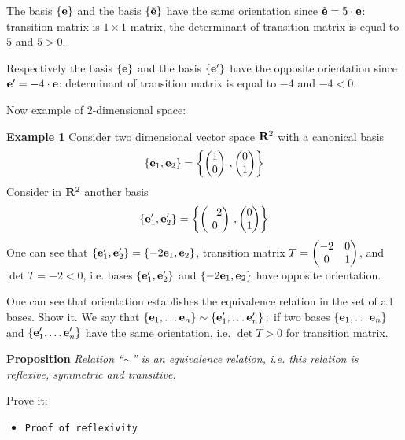 \documentclass[12pt]{article}
\numberwithin{equation}{section}
\begin{document}
The basis  $\{{\bf e}\}$ and  the basis $\{\tilde {{\bf e}}\}$ 
have the same orientation since $\tilde {{\bf e}}=5\cdot {\bf e}$:
transition matrix is $1\times 1$ matrix, the determinant 
of transition matrix is equal to $5$ and $5>0$.

Respectively the basis  $\{{\bf e}\}$ and  the basis $\{{\bf e}'\}$ 
have the opposite orientation since ${\bf e}'=-4\cdot {\bf e}$:
determinant of transition matrix is equal to $-4$ and $-4<0$.

\m

Now example of $2$-dimensional space:

  {\bf Example 1}  Consider two dimensional vector space
${\bf R}^2$ with a canonical basis  
           $$
 \{{\bf e}_1,{\bf e}_2\}=\left\{
     \begin{pmatrix}1\cr 0\cr\end{pmatrix}\,,
     \begin{pmatrix}0\cr 1\cr\end{pmatrix}
        \right\}
       $$
Consider in ${\bf R}^2$ another basis
           $$
 \{{\bf e}'_1,{\bf e}'_2\}=\left\{
     \begin{pmatrix}-2\cr 0\cr\end{pmatrix}\,,
     \begin{pmatrix}0\cr 1\cr\end{pmatrix}
        \right\}
       $$
One can see that $\{{\bf e}'_1,{\bf e}'_2\}=\{-2{\bf e}_1,{\bf e}_2\}$,
transition matrix 
$T=\begin{pmatrix} -2 & 0\cr 0 & 1\cr\end{pmatrix}$,
and $\det T=-2<0$, i.e. bases $\{{\bf e}'_1,{\bf e}'_2\}$ and
 $\{-2{\bf e}_1,{\bf e}_2\}$ have opposite orientation.
  


  One can see that orientation establishes  
the equivalence relation in the set of all bases. 
Show it.
  We say that 
                $
                \{{\bf e}_1,\dots{\bf e}_n\}\sim \{{\bf e}'_1,\dots{\bf e}'_n\}\,,
                $
  if two bases $\{{\bf e}_1,\dots{\bf e}_n\}$ and $\{{\bf e}'_1,\dots{\bf e}'_n\}$ 
have the same orientation, i.e.
  $\det T>0$ for transition matrix.

 {\bf Proposition} {\it Relation ``$\sim$'' is an equivalence relation, 
i.e. this
  relation is reflexive, symmetric and transitive.}




     Prove  it:
  
  \begin{itemize}
   \item {\tt Proof of reflexivity}
     \end {itemize}
\end{document}
